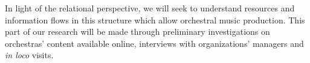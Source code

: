 \documentclass[a4paper, 12pt, openright, oneside, german, french, brazil, english]{abntex2}
\begin{document}
	
	In light of the relational perspective, we will seek to understand resources and information flows in this structure which allow orchestral music production. This part of our research will be made through preliminary investigations on orchestras' content available online, interviews with organizations' managers and \textit{in loco} visits.
	
\end{document}
